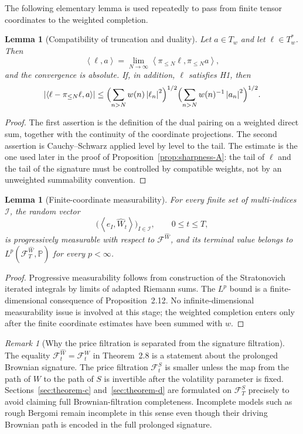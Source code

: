 \documentclass[11pt,oneside]{article}
\theoremstyle{plain}
\newtheorem{lemma}[theorem]{Lemma}
\theoremstyle{definition}
\theoremstyle{remark}
\newtheorem{remark}[theorem]{Remark}
\newcommand{\Pp}{\mathbb{P}}
\newcommand{\Tw}{T_w}
\newcommand{\Tstarw}{T_w^\ast}
\newcommand{\cW}{\widehat W}
\newcommand{\FWh}{\mathcal F^{\widehat W}}
\newcommand{\FW}{\mathcal F^W}
\newcommand{\FS}{\mathcal F^S}
\newcommand{\abs}[1]{\left\lvert #1\right\rvert}
\newcommand{\inner}[2]{\left\langle #1,#2\right\rangle}
\begin{document}
The following elementary lemma is used repeatedly to pass from finite tensor coordinates to the weighted completion.
\begin{lemma}[Compatibility of truncation and duality]
\label{lem:truncation-duality}
Let $a\in\Tw$ and let $\ell\in\Tstarw$. Then
\[
\inner{\ell}{a}=\lim_{N\to\infty}\inner{\pi_{\leq N}\ell}{\pi_{\leq N}a},
\]
and the convergence is absolute. If, in addition, $\ell$ satisfies H1, then
\[
\abs{\inner{\ell-\pi_{\leq N}\ell}{a}}
\leq \Bigl(\sum_{n>N}w(n)\abs{\ell_n}^2\Bigr)^{1/2}
     \Bigl(\sum_{n>N}w(n)^{-1}\abs{a_n}^2\Bigr)^{1/2}.
\]
\end{lemma}

\begin{proof}
The first assertion is the definition of the dual pairing on a weighted direct sum, together with the continuity of the coordinate projections. The second assertion is Cauchy--Schwarz applied level by level to the tail. The estimate is the one used later in the proof of Proposition~\ref{prop:sharpness-A}: the tail of $\ell$ and the tail of the signature must be controlled by compatible weights, not by an unweighted summability convention.
\end{proof}

\begin{lemma}[Finite-coordinate measurability]
\label{lem:finite-coordinate-measurability}
For every finite set of multi-indices $\mathcal I$, the random vector
\[
\bigl(\inner{e_I}{\cW_t}\bigr)_{I\in\mathcal I},\qquad 0\leq t\leq T,
\]
is progressively measurable with respect to $\FWh$, and its terminal value belongs to $L^p(\FWh_T,\Pp)$ for every $p<\infty$.
\end{lemma}

\begin{proof}
Progressive measurability follows from construction of the Stratonovich iterated integrals by limits of adapted Riemann sums. The $L^p$ bound is a finite-dimensional consequence of Proposition~2.12. No infinite-dimensional measurability issue is involved at this stage; the weighted completion enters only after the finite coordinate estimates have been summed with $w$.
\end{proof}

\begin{remark}[Why the price filtration is separated from the signature filtration]
The equality $\FWh_t=\FW_t$ in Theorem~2.8 is a statement about the prolonged Brownian signature. The price filtration $\FS_t$ is smaller unless the map from the path of $W$ to the path of $S$ is invertible after the volatility parameter is fixed. Sections~\ref{sec:theorem-c} and~\ref{sec:theorem-d} are formulated on $\FS_T$ precisely to avoid claiming full Brownian-filtration completeness. Incomplete models such as rough Bergomi remain incomplete in this sense even though their driving Brownian path is encoded in the full prolonged signature.
\end{remark}
\end{document}
